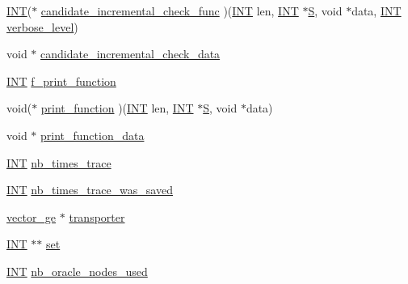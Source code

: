 \begin{DoxyCompactItemize}
\item 
\mbox{\hyperlink{galois_8h_a09fddde158a3a20bd2dcadb609de11dc}{I\+NT}}($\ast$ \mbox{\hyperlink{classgenerator_abb2be54d4384c500bf4e6556a5b990da}{candidate\+\_\+incremental\+\_\+check\+\_\+func}} )(\mbox{\hyperlink{galois_8h_a09fddde158a3a20bd2dcadb609de11dc}{I\+NT}} len, \mbox{\hyperlink{galois_8h_a09fddde158a3a20bd2dcadb609de11dc}{I\+NT}} $\ast$\mbox{\hyperlink{classgenerator_a5d2b65e2bd0e451744af1a47ba00bd96}{S}}, void $\ast$data, \mbox{\hyperlink{galois_8h_a09fddde158a3a20bd2dcadb609de11dc}{I\+NT}} \mbox{\hyperlink{classgenerator_a7fedc6488314cbc00dbfcc42d311e1ce}{verbose\+\_\+level}})
\item 
void $\ast$ \mbox{\hyperlink{classgenerator_ae85cfa00a35f333d1a52afba3ffe46d3}{candidate\+\_\+incremental\+\_\+check\+\_\+data}}
\item 
\mbox{\hyperlink{galois_8h_a09fddde158a3a20bd2dcadb609de11dc}{I\+NT}} \mbox{\hyperlink{classgenerator_a186323d69938c2cf33c48630f08dd9ae}{f\+\_\+print\+\_\+function}}
\item 
void($\ast$ \mbox{\hyperlink{classgenerator_a4ae8750633bf5ad4b26734187d8cf90b}{print\+\_\+function}} )(\mbox{\hyperlink{galois_8h_a09fddde158a3a20bd2dcadb609de11dc}{I\+NT}} len, \mbox{\hyperlink{galois_8h_a09fddde158a3a20bd2dcadb609de11dc}{I\+NT}} $\ast$\mbox{\hyperlink{classgenerator_a5d2b65e2bd0e451744af1a47ba00bd96}{S}}, void $\ast$data)
\item 
void $\ast$ \mbox{\hyperlink{classgenerator_a7e5e24fc7598bdf7cdb8e11517016825}{print\+\_\+function\+\_\+data}}
\item 
\mbox{\hyperlink{galois_8h_a09fddde158a3a20bd2dcadb609de11dc}{I\+NT}} \mbox{\hyperlink{classgenerator_ab2339828da149ba0bd683f1acbf6dd87}{nb\+\_\+times\+\_\+trace}}
\item 
\mbox{\hyperlink{galois_8h_a09fddde158a3a20bd2dcadb609de11dc}{I\+NT}} \mbox{\hyperlink{classgenerator_a7a0f5bec7c30d4cf794b9ae2a3d33b32}{nb\+\_\+times\+\_\+trace\+\_\+was\+\_\+saved}}
\item 
\mbox{\hyperlink{classvector__ge}{vector\+\_\+ge}} $\ast$ \mbox{\hyperlink{classgenerator_a93919c2acbe661d0942063a1922ec4b3}{transporter}}
\item 
\mbox{\hyperlink{galois_8h_a09fddde158a3a20bd2dcadb609de11dc}{I\+NT}} $\ast$$\ast$ \mbox{\hyperlink{classgenerator_a639a0adaff6d5e123b6a0949866cb498}{set}}
\item 
\mbox{\hyperlink{galois_8h_a09fddde158a3a20bd2dcadb609de11dc}{I\+NT}} \mbox{\hyperlink{classgenerator_a69e31b98244a727719c260f7e8cee159}{nb\+\_\+oracle\+\_\+nodes\+\_\+used}}
$$
\end{DoxyCompactItemize}
